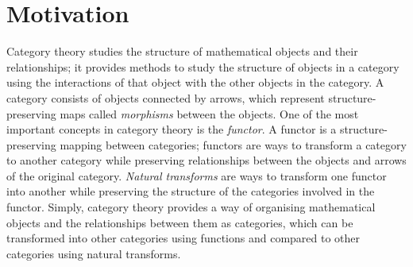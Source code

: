 
\section{Motivation}




Category theory studies the structure of mathematical objects and their relationships; it provides methods to study the structure of objects in a category using the interactions of that object with the other objects in the category.
A category consists of objects connected by arrows, which represent structure-preserving maps called \textit{morphisms} between the objects.
One of the most important concepts in category theory is the \textit{functor}.
A functor is a structure-preserving mapping between categories; functors are ways to transform a category to another category while preserving relationships between the objects and arrows of the original category.
\textit{Natural transforms} are ways to transform one functor into another while preserving the structure of the categories involved in the functor.
Simply, category theory provides a way of organising mathematical objects and the relationships between them as categories, which can be transformed into other categories using functions and compared to other categories using natural transforms.

